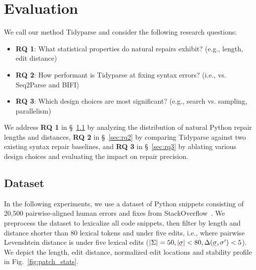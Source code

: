 \documentclass[sigplan,review,acmsmall,nonacm,anonymous]{acmart}\settopmatter{printfolios=false,printccs=false,printacmref=false}
\begin{document}
  \section{Evaluation}

  We call our method Tidyparse and consider the following research questions:

  \begin{itemize}
    \item \textbf{RQ 1}: What statistical properties do natural repairs exhibit? (e.g., length, edit distance)
    \item \textbf{RQ 2}: How performant is Tidyparse at fixing syntax errors? (i.e., vs. Seq2Parse and BIFI)
    \item \textbf{RQ 3}: Which design choices are most significant? (e.g., search vs. sampling, parallelism)
  \end{itemize}

  We address \textbf{RQ 1} in \S~\ref{sec:rq1} by analyzing the distribution of natural Python repair lengths and distances, \textbf{RQ 2} in \S~\ref{sec:rq2} by comparing Tidyparse against two existing syntax repair baselines, and \textbf{RQ 3} in \S~\ref{sec:rq3} by ablating various design choices and evaluating the impact on repair precision.

  \subsection{Dataset}\label{sec:rq1}

  In the following experiments, we use a dataset of Python snippets consisting of 20,500 pairwise-aligned human errors and fixes from StackOverflow~\cite{wong2019syntax}. We preprocess the dataset to lexicalize all code snippets, then filter by length and distance shorter than 80 lexical tokens and under five edits, i.e., where pairwise Levenshtein distance is under five lexical edits ($|\Sigma| = 50, |\err{\sigma}| < 80, \Delta(\err{\sigma}, \sigma') < 5$). We depict the length, edit distance, normalized edit locations and stability profile in Fig.~\ref{fig:patch_stats}.
\end{document}
